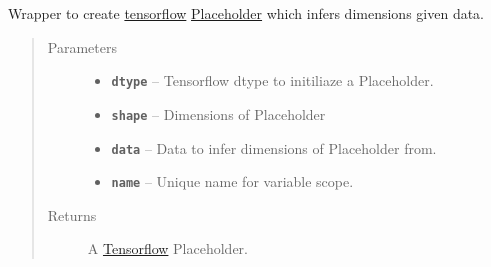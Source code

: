 \documentclass[letterpaper,10pt,english]{sphinxmanual}
\begin{document}
\begin{fulllineitems}
\label{node_ops:node_ops.placeholder}
Wrapper to create \href{https://www.tensorflow.org/}{tensorflow} \href{https://www.tensorflow.org/versions/r0.7/api\_docs/python/io\_ops.html\#placeholders}{Placeholder} which infers dimensions given data.
\begin{quote}\begin{description}
\item[{Parameters}] \leavevmode\begin{itemize}
\item {} 
\textbf{\texttt{dtype}} -- Tensorflow dtype to initiliaze a Placeholder.

\item {} 
\textbf{\texttt{shape}} -- Dimensions of Placeholder

\item {} 
\textbf{\texttt{data}} -- Data to infer dimensions of Placeholder from.

\item {} 
\textbf{\texttt{name}} -- Unique name for variable scope.

\end{itemize}

\item[{Returns}] \leavevmode
A \href{https://www.tensorflow.org/}{Tensorflow} Placeholder.

\end{description}\end{quote}

\end{fulllineitems}

\end{document}
